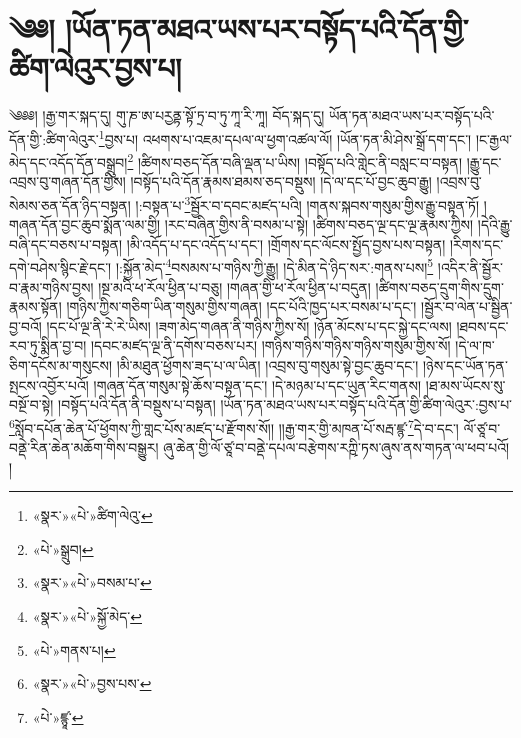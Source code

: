\chapter{༄༅། །ཡོན་ཏན་མཐའ་ཡས་པར་བསྟོད་པའི་དོན་གྱི་ཚིག་ལེའུར་བྱས་པ།}༄༅༅། །རྒྱ་གར་སྐད་དུ། གུ་ཎ་ཨ་པརྱནྟ་སྟོ་ཏྲ་བ་ཏུ་ཀཱ་རི་ཀཱ། བོད་སྐད་དུ། ཡོན་ཏན་མཐའ་ཡས་པར་བསྟོད་པའི་དོན་གྱི་:ཚིག་ལེའུར་\footnote{«སྣར་»«པེ་»ཚིག་ལེའུ་}བྱས་པ། འཕགས་པ་འཇམ་དཔལ་ལ་ཕྱག་འཚལ་ལོ། །ཡོན་ཏན་མི་ཤེས་སྒྲོ་དག་དང་། །ང་རྒྱལ་མེད་དང་འདོད་དོན་བསྒྲུབ།\footnote{«པེ་»སྒྲུབ།} །ཚིགས་བཅད་དོན་བཞི་ལྡན་པ་ཡིས། །བསྟོད་པའི་གླེང་ནི་བསླང་བ་བསྟན། །རྒྱུ་དང་འབྲས་བུ་གཞན་དོན་གྱིས། །བསྟོད་པའི་དོན་རྣམས་ཐམས་ཅད་བསྡུས། །དེ་ལ་དང་པོ་བྱང་ཆུབ་རྒྱུ། །འབྲས་བུ་སེམས་ཅན་དོན་ཉིད་བསྟན། །:བསྟན་པ་\footnote{«སྣར་»«པེ་»བསམ་པ་}སྦྱོར་བ་དབང་མཛད་པའི། །གནས་སྐབས་གསུམ་གྱིས་རྒྱུ་བསྟན་ཏོ། །གཞན་དོན་བྱང་ཆུབ་སྨོན་ལམ་གྱི། །རང་བཞིན་གྱིས་ནི་བསམ་པ་སྟེ། །ཚིགས་བཅད་ལྔ་དང་ལྔ་རྣམས་ཀྱིས། །དེའི་རྒྱུ་བཞི་དང་བཅས་པ་བསྟན། །མི་འདོད་པ་དང་འདོད་པ་དང་། །གྲོགས་དང་ལོངས་སྤྱོད་བྱས་པས་བསྟན། །རིགས་དང་དགེ་བཤེས་སྙིང་རྗེ་དང་། །:སྐྱོན་མེད་\footnote{«སྣར་»«པེ་»སྐྱོ་མེད་}བསམས་པ་གཉིས་ཀྱི་རྒྱུ། །དེ་མིན་དེ་ཉིད་སར་:གནས་པས།\footnote{«པེ་»གནས་པ།} །འདིར་ནི་སྦྱོར་བ་རྣམ་གཉིས་བྱས། །སྔ་མའི་ཕ་རོལ་ཕྱིན་པ་བཅུ། །གཞན་གྱི་ཕ་རོལ་ཕྱིན་པ་བདུན། །ཚིགས་བཅད་དྲུག་གིས་དྲུག་རྣམས་སྟོན། །གཉིས་ཀྱིས་གཅིག་ཡིན་གསུམ་གྱིས་གཞན། །དང་པོའི་ཁྱད་པར་བསམ་པ་དང་། །སྦྱོར་བ་ལེན་པ་སྦྱིན་བྱ་བའོ། །དང་པོ་ལྔ་ནི་རེ་རེ་ཡིས། །ཟག་མེད་གཞན་ནི་གཉིས་ཀྱིས་སོ། །ཉོན་མོངས་པ་དང་སྐྱེ་དང་ལས། །ཐབས་དང་རབ་ཏུ་སྨིན་བྱ་བ། །དབང་མཛད་ལྔ་ནི་དགོས་བཅས་པར། །གཉིས་གཉིས་གཉིས་གཉིས་གསུམ་གྱིས་སོ། །དེ་ལ་ཁ་ཅིག་དངོས་མ་གསུངས། །མི་མཐུན་ཕྱོགས་ཟད་པ་ལ་ཡིན། །འབྲས་བུ་གསུམ་སྟེ་བྱང་ཆུབ་དང་། །ཉེས་དང་ཡོན་ཏན་སྤངས་འབྱོར་པའོ། །གཞན་དོན་གསུམ་སྟེ་ཆོས་བསྟན་དང་། །དེ་མཉམ་པ་དང་ཡུན་རིང་གནས། །ཐ་མས་ཡོངས་སུ་བསྔོ་བ་སྟེ། །བསྟོད་པའི་དོན་ནི་བསྡུས་པ་བསྟན། །ཡོན་ཏན་མཐའ་ཡས་པར་བསྟོད་པའི་དོན་གྱི་ཚིག་ལེའུར་:བྱས་པ་\footnote{«སྣར་»«པེ་»བྱས་པས་}སློབ་དཔོན་ཆེན་པོ་ཕྱོགས་ཀྱི་གླང་པོས་མཛད་པ་རྫོགས་སོ།། །།རྒྱ་གར་གྱི་མཁན་པོ་སརྦ་ཛྙ་\footnote{«པེ་»ཛྙཱ་}དེ་བ་དང་། ལོ་ཙཱ་བ་བནྡེ་རིན་ཆེན་མཆོག་གིས་བསྒྱུར། ཞུ་ཆེན་གྱི་ལོ་ཙཱ་བ་བནྡེ་དཔལ་བརྩེགས་རཀྵི་ཏས་ཞུས་ནས་གཏན་ལ་ཕབ་པའོ། ། 